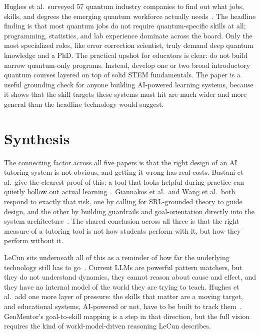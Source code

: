 \documentclass[12pt]{article}
\begin{document}
Hughes et al.\ surveyed 57 quantum industry companies to find out what jobs, skills, and degrees the emerging quantum workforce actually needs~\cite{hughes2022assessing}. The headline finding is that most quantum jobs do not require quantum-specific skills at all; programming, statistics, and lab experience dominate across the board. Only the most specialized roles, like error correction scientist, truly demand deep quantum knowledge and a PhD. The practical upshot for educators is clear: do not build narrow quantum-only programs. Instead, develop one or two broad introductory quantum courses layered on top of solid STEM fundamentals. The paper is a useful grounding check for anyone building AI-powered learning systems, because it shows that the skill targets these systems must hit are much wider and more general than the headline technology would suggest.

\section{Synthesis}

The connecting factor across all five papers is that the right design of an AI tutoring system is not obvious, and getting it wrong has real costs. Bastani et al.\ give the clearest proof of this: a tool that looks helpful during practice can quietly hollow out actual learning~\cite{bastani2024generative}. Giannakos et al.\ and Wang et al.\ both respond to exactly that risk, one by calling for SRL-grounded theory to guide design, and the other by building guardrails and goal-orientation directly into the system architecture~\cite{giannakos2024promise, wang2025genmentor}. The shared conclusion across all three is that the right measure of a tutoring tool is not how students perform with it, but how they perform without it.

\newpage

LeCun sits underneath all of this as a reminder of how far the underlying technology still has to go~\cite{lecun2022path}. Current LLMs are powerful pattern matchers, but they do not understand dynamics, they cannot reason about cause and effect, and they have no internal model of the world they are trying to teach. Hughes et al.\ add one more layer of pressure: the skills that matter are a moving target, and educational systems, AI-powered or not, have to be built to track them~\cite{hughes2022assessing}. GenMentor's goal-to-skill mapping is a step in that direction, but the full vision requires the kind of world-model-driven reasoning LeCun describes.



\end{document}
